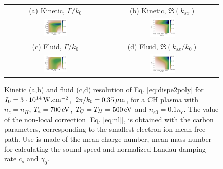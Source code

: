 \documentclass[
 reprint,
 amsmath,amssymb,
 aps,
]{revtex4-1}
\begin{document}
\begin{figure}
\begin{tabular}{cc}
(a) Kinetic, $\Gamma/k_0$ &
(b)  Kinetic, $\Re(k_{sx})$ \\
\includegraphics[width=0.24\textwidth]{G_Te700eV_Ti500_3e14_3w_1e-1nc_CH.png}&
\includegraphics[width=0.24\textwidth]{k_Te700eV_Ti500_3e14_3w_1e-1nc_CH.png}\\
(c) Fluid, $\Gamma/k_0$  &
(d) Fluid, $\Re(k_{sx}/k_0)$  \\
\includegraphics[width=0.24\textwidth]{Gf_Te700eV_Ti500_3e14_3w_1e-1nc_CH.png}&
\includegraphics[width=0.24\textwidth]{kf_Te700eV_Ti500_3e14_3w_1e-1nc_CH.png}
\end{tabular}
\caption{ \label{fig:dispeCH}  
Kinetic (a,b) and fluid (c,d) resolution of Eq. \eqref{eq:dispe2poly} for  $I_0 = 3\cdot 10^{14}\, \rm W.cm^{-2}$, $2\pi/k_0=0.35 \,\rm\mu m$, for a CH plasma with $n_c=n_H$, $T_e =700\,\rm  eV$, $T_C=T_H =500\,  \rm eV$ and $n_{e0}=0.1n_c$. The value of the non-local correction [Eq. \eqref{eq:nl}], is obtained with the carbon parameters, corresponding to the smallest electron-ion mean-free-path. Use is made of the mean charge number, mean mass number   for calculating the sound speed and normalized Landau damping rate $c_s$ and $\gamma_0$.
 }
\end{figure}
\end{document}
